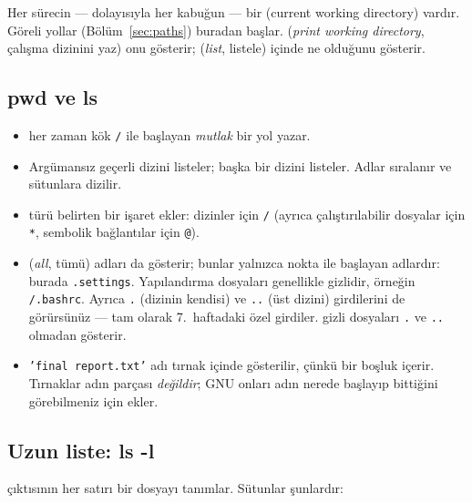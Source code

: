 Her sürecin --- dolayısıyla her kabuğun --- bir  (current working directory) vardır. Göreli yollar (Bölüm~\ref{sec:paths}) buradan başlar.  (\emph{print working directory}, çalışma dizinini yaz) onu gösterir;  (\emph{list}, listele) içinde ne olduğunu gösterir.

\subsection{pwd ve ls}


\begin{itemize}
  \item {} her zaman kök \texttt{/} ile başlayan \emph{mutlak} bir yol yazar.
  \item Argümansız  geçerli dizini listeler;  başka bir dizini listeler. Adlar sıralanır ve sütunlara dizilir.
  \item {} türü belirten bir işaret ekler: dizinler için \texttt{/} (ayrıca çalıştırılabilir dosyalar için \texttt{*}, sembolik bağlantılar için \texttt{@}).
  \item {} (\emph{all}, tümü)  adları da gösterir; bunlar yalnızca nokta ile başlayan adlardır: burada \texttt{.settings}. Yapılandırma dosyaları genellikle gizlidir, örneğin \texttt{\tl/.bashrc}. Ayrıca \texttt{.} (dizinin kendisi) ve \texttt{..} (üst dizini) girdilerini de görürsünüz --- tam olarak 7.\ haftadaki özel girdiler.  gizli dosyaları \texttt{.} ve \texttt{..} olmadan gösterir.
  \item \texttt{'final report.txt'} adı tırnak içinde gösterilir, çünkü bir boşluk içerir. Tırnaklar adın parçası \emph{değildir}; GNU  onları adın nerede başlayıp bittiğini görebilmeniz için ekler.
\end{itemize}

\subsection{Uzun liste: ls -l}


 çıktısının her satırı bir dosyayı tanımlar. Sütunlar şunlardır:

